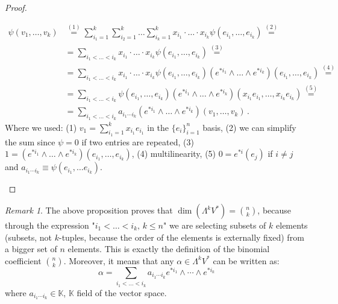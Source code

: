 \documentclass[a4paper,11pt,titlepage, article, oneside]{memoir}
\numberwithin{equation}{section}
\theoremstyle{definition}
\theoremstyle{remark}
\newtheorem{remark}[theorem]{Remark}
\begin{document}
\begin{proof}[Proof]
\begin{itemize}
\begin{align*}
\psi(v_1, \ldots, v_k) &\overset{(1)}{=} \sum\limits_{i_1 = 1}^k \sum\limits_{i_2 = 1}^k \ldots \sum\limits_{i_k = 1}^k x_{i_1} \cdot \ldots \cdot x_{i_k} \psi(e_{i_1}, \ldots, e_{i_k}) \overset{(2)}{=} \\
&= \sum\limits_{i_1 < \ldots < i_k} x_{i_1} \cdot \ldots \cdot x_{i_k} \psi(e_{i_1}, \ldots, e_{i_k}) \overset{(3)}{=} \\
&= \sum\limits_{i_1 < \ldots < i_k} x_{i_1} \cdot \ldots \cdot x_{i_k} \psi(e_{i_1}, \ldots, e_{i_k}) (e^{*i_1} \wedge \ldots \wedge e^{*i_k}) (e_{i_1}, \ldots, e_{i_k}) \overset{(4)}{=} \\
&= \sum\limits_{i_1 < \ldots < i_k} \psi(e_{i_1}, \ldots, e_{i_k}) (e^{*i_1} \wedge \ldots \wedge e^{*i_k}) (x_{i_1}e_{i_1}, \ldots, x_{i_k}e_{i_k}) \overset{(5)}{=} \\
&= \sum\limits_{i_1 < \ldots < i_k} a_{i_1 \cdots i_k}(e^{*i_1} \wedge \ldots \wedge e^{*i_k}) (v_1, \ldots, v_k) \, .
\end{align*}
Where we used: (1) $v_1 = \sum\limits_{i_1 = 1}^k x_{i_1}e_{i_1}$ in the $\{e_i\}_{i=1}^n$ basis, (2) we can simplify the sum since $\psi=0$ if two entries are repeated, (3) $1 = (e^{*i_1} \wedge \ldots \wedge e^{*i_k}) (e_{i_1}, \ldots, e_{i_k})$, (4) multilinearity, (5) $0 = e^{*i}(e_j)$ if $i \not = j$ and $a_{i_1 \cdots i_k} \equiv \psi(e_{i_1}, \ldots e_{i_k})$. \qedhere
\end{itemize}
\end{proof}

\begin{remarkbox}\begin{remark}
  The above proposition proves that $\dim(\Lambda^k V^*)=\binom{n}{k}$, because through the expression "$i_1 < \ldots < i_k, \, k \le n$" we are selecting subsets of $k$ elements (subsets, not $k$-tuples, because the order of the elements is externally fixed) from a bigger set of $n$ elements. This is exactly the definition of the binomial coefficient $\binom{n}{k}$. Moreover, it means that any $\alpha \in \Lambda^k V^*$ can be written as:
  \begin{equation*}
    \alpha = \sum\limits_{i_1 < \ldots < i_k} a_{i_1 \cdots i_k} e^{*i_1} \wedge \cdots \wedge e^{*i_k}
  \end{equation*}
  where $a_{i_1 \cdots i_k} \in \mathbb{K}$, $\mathbb{K}$ field of the vector space.
\end{remark}\end{remarkbox}
\end{document}

